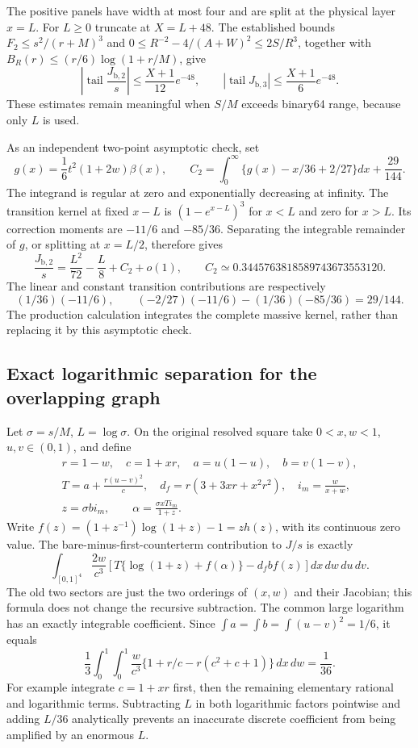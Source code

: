 The positive panels have width at most four and are split at the physical
layer $x=L$. For $L\ge0$ truncate at $X=L+48$. The established bounds
$F_2\le s^2/(r+M)^3$ and
$0\le R^{-2}-4/(A+W)^2\le2S/R^3$, together with
$B_R(r)\le(r/6)\log(1+r/M)$, give
\[
 \left|\operatorname{tail}\frac{J_{\mathrm{b},2}}s\right|
 \le\frac{X+1}{12}e^{-48},\qquad
 |\operatorname{tail}J_{\mathrm{b},3}|
 \le\frac{X+1}{6}e^{-48}.
\]
These estimates remain meaningful when $S/M$ exceeds binary64 range,
because only $L$ is used.

As an independent two-point asymptotic check, set
\[
 g(x)=\frac16t^2(1+2w)\beta(x),\qquad
 C_2=\int_0^\infty\{g(x)-x/36+2/27\}dx+\frac{29}{144}.
\]
The integrand is regular at zero and exponentially decreasing at infinity.
The transition kernel at fixed $x-L$ is $(1-e^{x-L})^3$ for $x<L$ and
zero for $x>L$. Its correction moments are $-11/6$ and $-85/36$.
Separating the integrable remainder of $g$, or splitting at $x=L/2$,
therefore gives
\[
 \frac{J_{\mathrm{b},2}}s=\frac{L^2}{72}-\frac L8+C_2+o(1),\qquad
 C_2\simeq0.3445763818589743673553120.
\]
The linear and constant transition contributions are respectively
\[
 (1/36)(-11/6),\qquad
 (-2/27)(-11/6)-(1/36)(-85/36)=29/144.
\]
The production calculation integrates the complete massive kernel, rather
than replacing it by this asymptotic check.

\subsection{Exact logarithmic separation for the overlapping graph}

Let $\sigma=s/M$, $L=\log\sigma$. On the original resolved square take
$0<x,w<1$, $u,v\in(0,1)$, and define
\begin{gather*}
 r=1-w,\quad c=1+xr,\quad a=u(1-u),\quad b=v(1-v),\\
 T=a+\frac{r(u-v)^2}{c},\quad
 d_f=r(3+3xr+x^2r^2),\quad i_m=\frac{w}{x+w},\\
 z=\sigma b i_m,\qquad
 \alpha=\frac{\sigma xTi_m}{1+z}.
\end{gather*}
Write $f(z)=(1+z^{-1})\log(1+z)-1=z h(z)$, with its continuous zero
value. The bare-minus-first-counterterm contribution to $J/s$ is exactly
\[
 \int_{[0,1]^4}\frac{2w}{c^3}
 \left[T\{\log(1+z)+f(\alpha)\}-d_f b f(z)\right]dx\,dw\,du\,dv.
\]
The old two sectors are just the two orderings of $(x,w)$ and their
Jacobian; this formula does not change the recursive subtraction.
The common large logarithm has an exactly integrable coefficient. Since
$\int a=\int b=\int(u-v)^2=1/6$, it equals
\[
 \frac13\int_0^1\int_0^1\frac{w}{c^3}
           \{1+r/c-r(c^2+c+1)\}\,dx\,dw=\frac1{36}.
\]
For example integrate $c=1+xr$ first, then the remaining elementary
rational and logarithmic terms. Subtracting $L$ in both logarithmic
factors pointwise and adding $L/36$ analytically prevents an inaccurate
discrete coefficient from being amplified by an enormous $L$.

